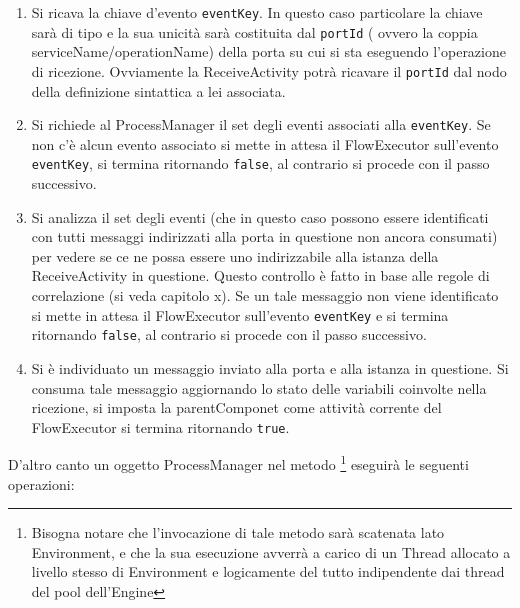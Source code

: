 \begin{enumerate}
  \item Si ricava la chiave d'evento \texttt{eventKey}. In questo caso
  particolare la chiave sarà di tipo  e la sua
  unicità sarà costituita dal \texttt{portId} ( ovvero la coppia 
  serviceName/operationName) della porta su cui si sta eseguendo l'operazione di 
  ricezione. Ovviamente la ReceiveActivity potrà ricavare il \texttt{portId}
  dal nodo della definizione sintattica a lei associata.
  
  \item Si richiede al ProcessManager il set degli eventi associati alla
  \texttt{eventKey}. Se non c'è alcun evento associato si mette in attesa il
  FlowExecutor sull'evento \texttt{eventKey}, si termina ritornando
  \texttt{false}, al contrario si procede con il passo successivo.
  
  \item Si analizza il set degli eventi (che in questo caso possono essere
  identificati con tutti messaggi indirizzati alla porta in questione non
  ancora consumati) per vedere se ce ne possa essere uno indirizzabile alla
  istanza della ReceiveActivity in questione. Questo controllo \`e fatto in
  base alle regole di correlazione (si veda capitolo x). Se un tale messaggio
  non viene identificato si mette in attesa il FlowExecutor sull'evento \texttt{eventKey} e si termina
  ritornando \texttt{false}, al contrario si procede con il passo successivo.
  
  \item Si \`e individuato un messaggio inviato alla porta e alla istanza in
  questione. Si consuma tale messaggio aggiornando lo stato delle variabili
  coinvolte nella ricezione, si imposta la parentComponet come attività
  corrente del FlowExecutor si termina ritornando \texttt{true}.
\end{enumerate}

D'altro canto un oggetto ProcessManager nel metodo \footnote{Bisogna notare che
l'invocazione di tale metodo sarà scatenata lato Environment, e che la sua
esecuzione avverrà a carico di un Thread allocato a livello stesso di
Environment e logicamente del tutto indipendente dai thread del pool
dell'Engine} eseguirà le seguenti operazioni:

